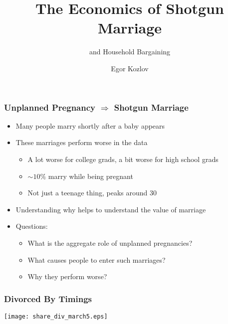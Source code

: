 \documentclass{beamer}
\title{The Economics of Shotgun Marriage}
\subtitle{and Household Bargaining}
\author{Egor Kozlov}
\institute{
  Department of Economics\\
  Northwestern University}
\begin{document}
% 


\begin{frame}[plain]
\addtocounter{framenumber}{-1}
\date{\scriptsize}
\titlepage
\end{frame}


\begin{frame}
\frametitle{Unplanned Pregnancy $\Rightarrow$ Shotgun Marriage}
\begin{itemize}
\item Many people marry shortly after a baby appears
\item These marriages perform worse in the data 
\begin{itemize}
\item A lot worse for college grads, a bit worse for high school grads
\item $\sim10\%$ marry while being pregnant
\item Not just a teenage thing, peaks around 30
\end{itemize}
\item Understanding why helps to understand the value of marriage
\item Questions:
\begin{itemize}
\item What is the aggregate role of unplanned pregnancies?
\item What causes people to enter such marriages?
\item Why they perform worse?
\end{itemize}
\end{itemize}
\end{frame}



\begin{frame}[label=pic0]
\frametitle{Divorced By Timings}
\begin{center}
\texttt{[image: share\_div\_march5.eps]}
\end{center}
\end{frame}
\end{document}
